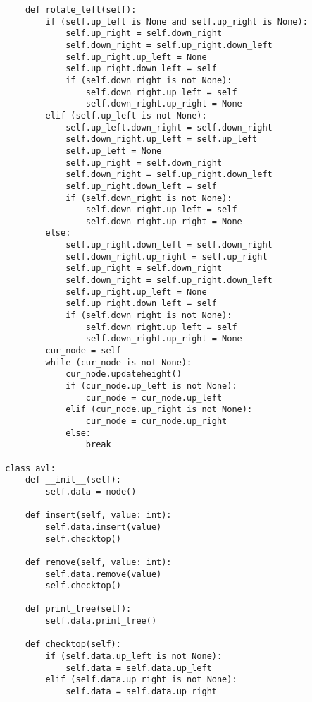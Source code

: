 \begin{lstlisting}
            def rotate_left(self):
                if (self.up_left is None and self.up_right is None):
                    self.up_right = self.down_right
                    self.down_right = self.up_right.down_left
                    self.up_right.up_left = None
                    self.up_right.down_left = self
                    if (self.down_right is not None):
                        self.down_right.up_left = self
                        self.down_right.up_right = None
                elif (self.up_left is not None):
                    self.up_left.down_right = self.down_right
                    self.down_right.up_left = self.up_left
                    self.up_left = None
                    self.up_right = self.down_right
                    self.down_right = self.up_right.down_left
                    self.up_right.down_left = self
                    if (self.down_right is not None):
                        self.down_right.up_left = self
                        self.down_right.up_right = None
                else:
                    self.up_right.down_left = self.down_right
                    self.down_right.up_right = self.up_right
                    self.up_right = self.down_right
                    self.down_right = self.up_right.down_left
                    self.up_right.up_left = None
                    self.up_right.down_left = self
                    if (self.down_right is not None):
                        self.down_right.up_left = self
                        self.down_right.up_right = None
                cur_node = self
                while (cur_node is not None):
                    cur_node.updateheight()
                    if (cur_node.up_left is not None):
                        cur_node = cur_node.up_left
                    elif (cur_node.up_right is not None):
                        cur_node = cur_node.up_right
                    else:
                        break

        class avl:
            def __init__(self):
                self.data = node()
                
            def insert(self, value: int):
                self.data.insert(value)
                self.checktop()
                
            def remove(self, value: int):
                self.data.remove(value)
                self.checktop()
                
            def print_tree(self):
                self.data.print_tree()
                
            def checktop(self):
                if (self.data.up_left is not None):
                    self.data = self.data.up_left
                elif (self.data.up_right is not None):
                    self.data = self.data.up_right
    \end{lstlisting}